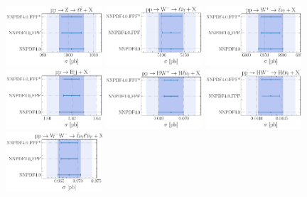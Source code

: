 \begin{figure}[t]
\centering
\includegraphics[width=0.32\textwidth]{plots/LHCpheno/NNPDF_DY_14TEV_40_PHENO-integrated.pdf}
\includegraphics[width=0.32\textwidth]{plots/LHCpheno/NNPDF_WM_14TEV_40_PHENO-integrated.pdf}
\includegraphics[width=0.32\textwidth]{plots/LHCpheno/NNPDF_WP_14TEV_40_PHENO-integrated.pdf}
\includegraphics[width=0.32\textwidth]{plots/LHCpheno/NNPDF_HVBF_14TEV_40_PHENO-integrated.pdf}
\includegraphics[width=0.32\textwidth]{plots/LHCpheno/NNPDF_HWP_14TEV_40_PHENO-integrated.pdf}
\includegraphics[width=0.32\textwidth]{plots/LHCpheno/NNPDF_HWM_14TEV_40_PHENO-integrated.pdf}
\includegraphics[width=0.32\textwidth]{plots/LHCpheno/NNPDF_WPWM_14TEV_40_PHENO-integrated.pdf}

\end{figure}
